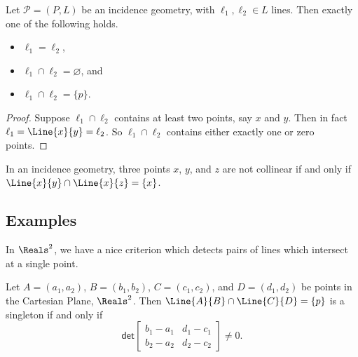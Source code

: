 \documentclass{article}
\begin{document}
\begin{prop}
Let $\mathcal{P} = (P,L)$ be an incidence geometry, with $\ell_1, \ell_2 \in L$ lines. Then exactly one of the following holds.
\begin{itemize}
\item $\ell_1 = \ell_2$,
\item $\ell_1 \cap \ell_2 = \varnothing$, and
\item $\ell_1 \cap \ell_2 = \{p\}$.
\end{itemize}
\end{prop}

\begin{proof}
Suppose $\ell_1 \cap \ell_2$ contains at least two points, say $x$ and $y$. Then in fact $\ell_1 = \Line{x}{y} = \ell_2$. So $\ell_1 \cap \ell_2$ contains either exactly one or zero points.
\end{proof}

\begin{cor}
In an incidence geometry, three points $x$, $y$, and $z$ are not collinear if and only if $\Line{x}{y} \cap \Line{x}{z} = \{x\}$.
\end{cor}



\subsection*{Examples}

In $\Reals^2$, we have a nice criterion which detects pairs of lines which intersect at a single point.

\begin{prop}
Let $A = (a_1,a_2)$, $B = (b_1,b_2)$, $C = (c_1,c_2)$, and $D = (d_1,d_2)$ be points in the Cartesian Plane, $\Reals^2$. Then $\Line{A}{B} \cap \Line{C}{D} = \{p\}$ is a singleton if and only if \[ \mathsf{det} \begin{bmatrix} b_1 - a_1 & d_1 - c_1 \\ b_2 - a_2 & d_2 - c_2 \end{bmatrix} \neq 0. \]
\end{prop}
\end{document}
